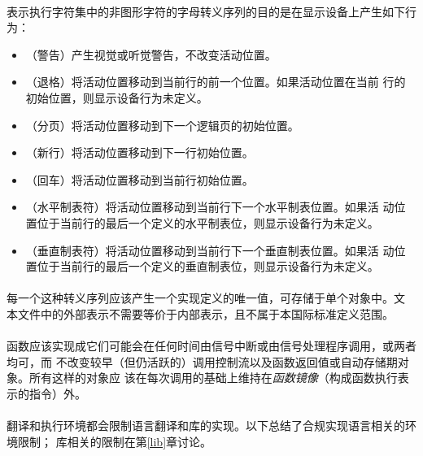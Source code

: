 \paragraph{}
表示执行字符集中的非图形字符的字母转义序列的目的是在显示设备上产生如下行为：
\begin{itemize}
  \item{（警告）产生视觉或听觉警告，不改变活动位置。}
  \item{（退格）将活动位置移动到当前行的前一个位置。如果活动位置在当前
    行的初始位置，则显示设备行为未定义。}
  \item{（分页）将活动位置移动到下一个逻辑页的初始位置。}
  \item{（新行）将活动位置移动到下一行初始位置。}
  \item{（回车）将活动位置移动到当前行初始位置。}
  \item{（水平制表符）将活动位置移动到当前行下一个水平制表位置。如果活
    动位置位于当前行的最后一个定义的水平制表位，则显示设备行为未定义。}
  \item{（垂直制表符）将活动位置移动到当前行下一个垂直制表位置。如果活
    动位置位于当前行的最后一个定义的垂直制表位，则显示设备行为未定义。}
\end{itemize}

\paragraph{}
每一个这种转义序列应该产生一个实现定义的唯一值，可存储于单个对象中。文
本文件中的外部表示不需要等价于内部表示，且不属于本国际标准定义范围。


\paragraph{}
函数应该实现成它们可能会在任何时间由信号中断或由信号处理程序调用，或两者均可，而
不改变较早（但仍活跃的）调用控制流以及函数返回值或自动存储期对象。所有这样的对象应
该在每次调用的基础上维持在\textit{函数镜像}（构成函数执行表示的指令）外。

\paragraph{}
翻译和执行环境都会限制语言翻译和库的实现。以下总结了合规实现语言相关的环境限制；
库相关的限制在第\ref{lib}章讨论。

